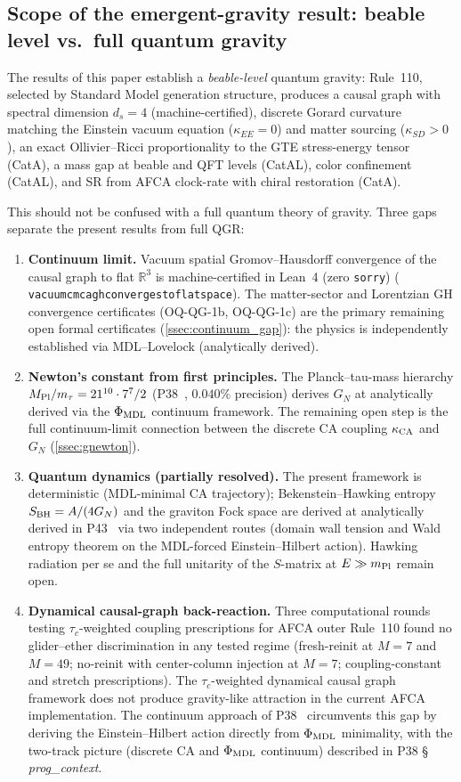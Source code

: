 \documentclass[11pt]{article}
\theoremstyle{remark}
\newcommand{\lean}[1]{%
  \penalty-100
  \begingroup\def\_{\textunderscore\allowbreak}\texttt{#1}\endgroup}
\newcommand{\CatAL}{machine-certified in Lean~4 (zero \texttt{sorry})}
\newcommand{\CatAD}{analytically derived}
\begin{document}
\subsection{Scope of the emergent-gravity result: beable level vs.\ full quantum gravity}
\label{ssec:qgr_scope}

The results of this paper establish a \emph{beable-level} quantum gravity:
Rule~110, selected by Standard Model generation structure, produces a causal
graph with spectral dimension $d_s = 4$ (machine-certified), discrete Gorard
curvature matching the Einstein vacuum equation ($\kappa_{EE} = 0$) and matter
sourcing ($\kappa_{SD} > 0$), an exact Ollivier--Ricci proportionality to the
GTE stress-energy tensor (CatA), a mass gap at beable and QFT levels (CatAL),
color confinement (CatAL), and SR from AFCA clock-rate with chiral restoration
(CatA).

This should not be confused with a full quantum theory of gravity.
Three gaps separate the present results from full QGR:
\begin{enumerate}[leftmargin=2em]
\item \textbf{Continuum limit.}  Vacuum spatial Gromov--Hausdorff convergence
of the causal graph to flat $\mathbb{R}^3$ is \CatAL{}
(\lean{vacuum\_cmca\_gh\_converges\_to\_flat\_space}). The matter-sector and
Lorentzian GH convergence certificates (OQ-QG-1b, OQ-QG-1c) are the primary
remaining open formal certificates (\cref{ssec:continuum_gap}): the physics
is independently established via MDL--Lovelock (\CatAD).
\item \textbf{Newton's constant from first principles.}  The Planck--tau-mass
hierarchy $M_{\rm Pl}/m_\tau = 21^{10} \cdot 7^7/2$ (P38~\cite{SpivackPhiMDLGravity},
$0.040\%$ precision) derives $G_N$ at \CatAD{} via the $\Phi_{\rm MDL}$
continuum framework.  The remaining open step is the full continuum-limit
connection between the discrete CA coupling $\kappa_{\rm CA}$ and $G_N$
(\cref{ssec:gnewton}).
\item \textbf{Quantum dynamics (partially resolved).}  The present framework is deterministic
(MDL-minimal CA trajectory); Bekenstein--Hawking entropy $S_{\rm BH} = A/(4G_N)$
and the graviton Fock space are derived at \CatAD{} in P43~\cite{SpivackCompleteness}
via two independent routes (domain wall tension and Wald entropy theorem on the
MDL-forced Einstein--Hilbert action).
Hawking radiation per se and the full unitarity of the $S$-matrix at $E \gg m_{\rm Pl}$
remain open.
\item \textbf{Dynamical causal-graph back-reaction.}  Three computational rounds
testing $\tau_c$-weighted coupling prescriptions for AFCA outer Rule~110 found
no glider--ether discrimination in any tested regime (fresh-reinit at $M=7$ and
$M=49$; no-reinit with center-column injection at $M=7$; coupling-constant and
stretch prescriptions).  The $\tau_c$-weighted dynamical causal graph framework
does not produce gravity-like attraction in the current AFCA implementation.
The continuum approach of P38~\cite{SpivackPhiMDLGravity} circumvents this gap
by deriving the Einstein--Hilbert action directly from $\Phi_{\rm MDL}$ minimality,
with the two-track picture (discrete CA and $\Phi_{\rm MDL}$ continuum) described
in P38 \S\,\textit{prog\_context}.
\end{enumerate}
\end{document}
